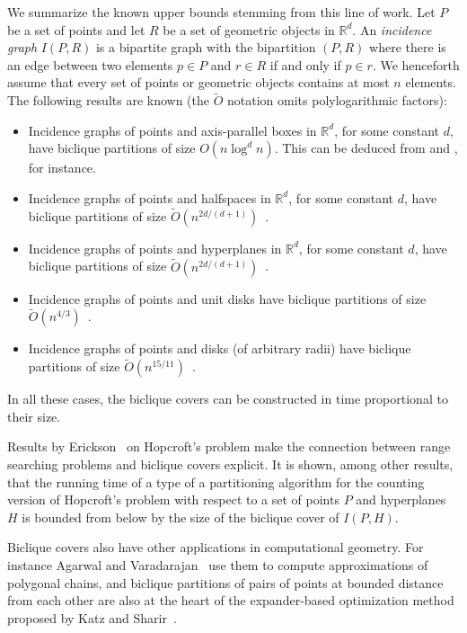 \documentclass{amsart}
\newcommand{\darkblue}{\color{darkblue}} %
\newcommand{\defn}[1]{\textsl{\darkblue #1}} %
\begin{document}
We summarize the known upper bounds stemming from this line of work.
Let $P$ be a set of points and let $R$ be a set of geometric objects in $\mathbb{R}^d$. An \defn{incidence graph} $I(P,R)$ is a bipartite graph with the bipartition $(P,R)$ where there is an edge between two elements $p\in P$ and $r\in R$ if and only if $p \in r$. We henceforth assume that every set of points or geometric objects contains at most $n$ elements. The following results are known (the $\tilde{O}$ notation omits polylogarithmic factors):
\begin{itemize}
\item Incidence graphs of points and axis-parallel boxes in $\mathbb{R}^d$, for some constant $d$, have biclique partitions of size $O(n \log^d n)$. This can be deduced from \cite[Section 3]{AE99} and \cite[Chapter 5]{CGbook}, for instance.
\item Incidence graphs of points and halfspaces in $\mathbb{R}^d$, for some constant $d$, have biclique partitions of size $\tilde{O}(n^{2d/(d+1)})$~\cite{M92}.  
\item Incidence graphs of points and hyperplanes in $\mathbb{R}^d$, for some constant $d$, have biclique partitions of size $\tilde{O}(n^{2d/(d+1)})$~\cite{BK03}.  
\item Incidence graphs of points and unit disks have biclique partitions of size $\tilde{O}(n^{4/3})$~\cite{MR1471987}.
\item Incidence graphs of points and disks (of arbitrary radii) have biclique partitions of size $\tilde{O}(n^{15/11})$~\cite{AES24}.
\end{itemize}

In all these cases, the biclique covers can be constructed in time proportional to their size.

Results by Erickson~\cite{E96} on Hopcroft's problem make the connection between range searching problems and biclique covers explicit. It is shown, among other results, that the running time of a type of a partitioning algorithm for the counting version of Hopcroft's problem with respect to a set of points $P$ and hyperplanes $H$ is bounded from below by the size of the biclique cover of $I(P,H)$.

Biclique covers also have other applications in computational geometry. 
For instance Agarwal and Varadarajan~\cite{MR1739610} use them to compute approximations of polygonal chains, and biclique partitions of pairs of points at bounded distance from each other are also at the heart of the expander-based optimization method proposed by Katz and Sharir~\cite{MR1471987}.
\end{document}
